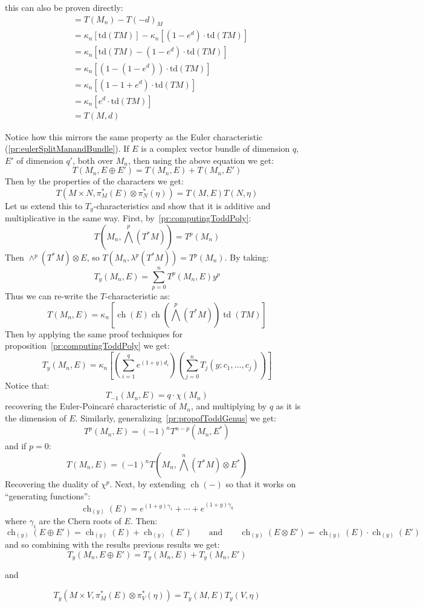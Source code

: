 \documentclass{book}
\newenvironment{Proof}[1][]
  {\begin{ProofTcb}[#1]}
  {\end{ProofTcb}}
\newcommand{\ch}{{\operatorname{ch}}}
\newcommand{\td}{{\operatorname{td}}}
\renewcommand{\ch}{{\operatorname{ch}}}
\begin{document}
\begin{Proof}
  this can also be proven directly:
  \begin{align*} &= T(M_n) - T(-d)_M \\ &= \kappa_n[\text{td}(TM)] - \kappa_n[(1 - e^d) \cdot \text{td}(TM)] \\
  &= \kappa_n[\text{td}(TM) - (1 - e^d) \cdot \text{td}(TM)] \\ &= \kappa_n[\left(1 - (1 - e^d)\right) \cdot
  \text{td}(TM)] \\ &= \kappa_n[\left(1 - 1 + e^d\right) \cdot \text{td}(TM)] \\ &= \kappa_n[e^d \cdot
  \text{td}(TM)]\\
  &= T(M, d)
  \end{align*}
\end{Proof}
Notice how this mirrors the same property as the Euler characteristic (\cref{pr:eulerSplitManandBundle}). If $E$ is a complex
vector bundle of dimension $q$, $E'$ of dimension $q'$, both over $M_n$, then using the
above equation we get:
\[
  T(M_n, E\oplus E') = T(M_n, E) + T(M_n, E')
\]
Then by the properties of the characters we get:
\[
  T(M\times N, \pi_M^*(E)\otimes \pi_N^*(\eta)) = T(M,E)T(N, \eta)
\]
Let us extend this to $T_y$-characteristics and show that it is additive and multiplicative in the same way.
First, by~\cref{pr:computingToddPoly}:
\[
  T \left(M_n, \bigwedge^p(T^*M)\right) = T^p(M_n)
\]
Then $\wedge^p(T^*M)\otimes E$, so $T(M_n, \lambda^p(T^*M)) = T^p(M_n)$. By taking:
\[
  T_y(M_n, E) = \sum_{p=0}^n T^p(M_n, E)y^p
\]
Thus we can re-write the $T$-characteristic as:
 \[
   T(M_n,E) = \kappa_n \left[\ch(E)\ch\left(\bigwedge^p(T^*M)\right) \td(TM)\right]
 \]
 Then by applying the same proof techniques for proposition~\cref{pr:computingToddPoly} we get:
\[
  T_y(M_n, E) = \kappa_n \left[\left(\sum_{i=1}^q e^{(1+y)d_i}\right)\left(\sum_{j=0}^n T_j(y;c_1,\ldots,c_j)\right)\right]
\]
Notice that:
\[
  T_{-1}(M_n, E) = q\cdot\chi(M_n)
\]
recovering the Euler-Poincar\'e characteristic of $M_n$, and multiplying by $q$ as it is the dimension of $E$.
Similarly, generalizing~\cref{pr:propofToddGenus} we get:
\[
  T^p(M_n, E) = (-1)^n T^{n-p}(M_n, E^*)
\]
and if $p  =0$:
\[
  T(M_n, E) = (-1)^n T\left(M_n, \bigwedge^n(T^*M)\otimes E^*\right)
\]
Recovering the duality of $\chi^p$. Next, by extending $\ch(-)$ so that it works on ``generating  functions'':
  \[
    \ch_{(y)}(E) = e^{(1+y)\gamma_1} + \cdots + e^{(1+y)\gamma_q}
  \]
where $\gamma_i$ are the Chern roots of $E$. Then:
\[
  \ch_{(y)}(E\oplus E') = \ch_{(y)}(E) + \ch_{(y)}(E') \qquad \text{and} \qquad \ch_{(y)}(E\otimes E')
  = \ch_{(y)}(E)\cdot \ch_{(y)}(E')
\]
and so combining with the results previous results we get:
\[
  T_y(M_n, E\oplus E') = T_y(M_n, E) + T_y(M_n, E')
\]
\begin{center}
  and
\end{center}
\[
  T_y(M\times V, \pi_M^*(E)\otimes \pi_V^*(\eta)) = T_y(M, E)T_y(V, \eta)
\]
\end{document}
